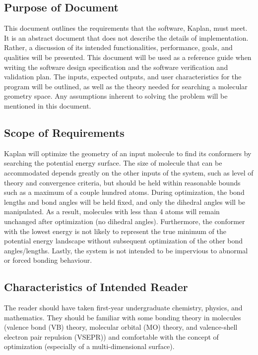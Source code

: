 \documentclass[12pt]{article}
\newcommand{\progname}{Kaplan} %
\begin{document}


\subsection{Purpose of Document}

This document outlines the requirements that the software, \progname{}, must 
meet. It is an abstract document that does not describe the details of 
implementation. Rather, a discussion of its intended functionalities, 
performance, goals, and qualities will be presented. This document will be used 
as a reference guide when writing the software design specification and the 
software verification and validation plan. The inputs, expected outputs, and 
user characteristics for the program will be outlined, as well as the theory 
needed for searching a molecular geometry space. Any assumptions inherent to 
solving the problem will be mentioned in this document. 

\subsection{Scope of Requirements}
Kaplan will optimize the geometry of an input molecule 
to find its conformers 
by searching the potential energy surface. The size of molecule that can be 
accommodated depends greatly on the other inputs of the system, such as level 
of theory and convergence criteria, but should be held within reasonable bounds 
such as a maximum of a couple hundred atoms. During 
optimization, the bond 
lengths and bond angles will be held fixed, and only 
the dihedral angles will 
be manipulated. As a result, molecules with less than 4 atoms will remain 
unchanged after optimization (no dihedral angles). 
Furthermore, the conformer 
with the lowest energy is not likely to represent the true minimum of the 
potential energy landscape without subsequent 
optimization of the other bond 
angles/lengths. Lastly, the system is not intended to be impervious to abnormal 
or forced bonding behaviour.

\subsection{Characteristics of Intended Reader} 
The reader should have taken first-year undergraduate chemistry, physics, and 
mathematics. They should be familiar with some bonding theory in molecules 
(valence bond (VB) theory, molecular orbital (MO) theory, and valence-shell 
electron pair repulsion (VSEPR)) and comfortable with the concept of 
optimization (especially of a multi-dimensional 
surface). 
\end{document}

